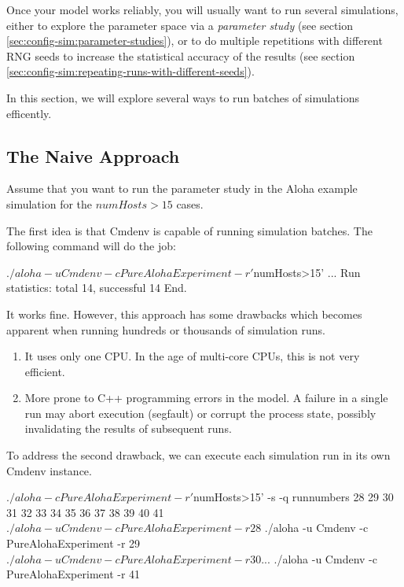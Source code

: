 Once your model works reliably, you will usually want to run several
simulations, either to explore the parameter space via a \textit{parameter
study} (see section \ref{sec:config-sim:parameter-studies}), or to do 
multiple repetitions with different RNG seeds to increase the statistical
accuracy of the results (see section
\ref{sec:config-sim:repeating-runs-with-different-seeds}). 

In this section, we will explore several ways to run batches of
simulations efficently.

\subsection{The Naive Approach}
\label{sec:run-sim:campaigns-naive-approach}

Assume that you want to run the parameter study in the Aloha example
simulation for the $numHosts>15$ cases. 

The first idea is that Cmdenv is capable of running simulation batches. 
The following command will do the job:

\begin{commandline}
$ ./aloha -u Cmdenv -c PureAlohaExperiment -r '$numHosts>15'
...
Run statistics: total 14, successful 14
End.
\end{commandline}
 
It works fine. However, this approach has some drawbacks which becomes
apparent when running hundreds or thousands of simulation runs.

\begin{enumerate}
  \item It uses only one CPU. In the age of multi-core CPUs, this is not 
        very efficient.
  \item More prone to C++ programming errors in the model. A failure in a single
        run may abort execution (segfault) or corrupt the process
        state, possibly invalidating the results of subsequent runs.
\end{enumerate}

To address the second drawback, we can execute each simulation run in its own
Cmdenv instance.

\begin{commandline}
$ ./aloha -c PureAlohaExperiment -r '$numHosts>15' -s -q runnumbers
28 29 30 31 32 33 34 35 36 37 38 39 40 41
$ ./aloha -u Cmdenv -c PureAlohaExperiment -r 28
$ ./aloha -u Cmdenv -c PureAlohaExperiment -r 29
$ ./aloha -u Cmdenv -c PureAlohaExperiment -r 30
...
$ ./aloha -u Cmdenv -c PureAlohaExperiment -r 41
\end{commandline}


